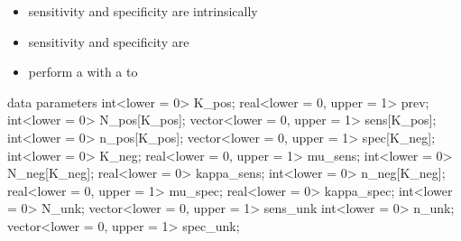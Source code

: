 \documentclass[10pt]{report}
\begin{document}
\begin{itemize}
\item sensitivity and specificity are intrinsically 
\item sensitivity and specificity are 
\item perform a  with a  to
\end{itemize}

{\small
\begin{stancode}
data {                             parameters {
  int<lower = 0> K_pos;              real<lower = 0, upper = 1> prev;
  int<lower = 0> N_pos[K_pos];       vector<lower = 0, upper = 1> sens[K_pos];
  int<lower = 0> n_pos[K_pos];       vector<lower = 0, upper = 1> spec[K_neg];
  int<lower = 0> K_neg;              real<lower = 0, upper = 1> mu_sens;
  int<lower = 0> N_neg[K_neg];       real<lower = 0> kappa_sens;
  int<lower = 0> n_neg[K_neg];       real<lower = 0, upper = 1> mu_spec;
                                     real<lower = 0> kappa_spec;
  int<lower = 0> N_unk;              vector<lower = 0, upper = 1> sens_unk
  int<lower = 0> n_unk;              vector<lower = 0, upper = 1> spec_unk;
}                                  }
\end{stancode}
}
\end{document}
